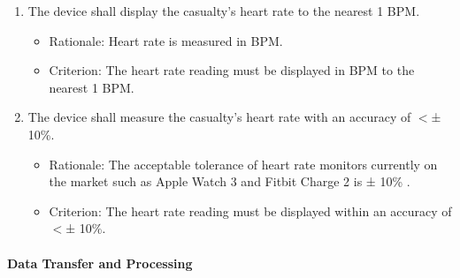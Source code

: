 \documentclass{article}
\begin{document}
\begin{enumerate}[label = \textbf{{FR7.}\arabic*} ]
	    \item The device shall display the casualty's heart rate to the nearest 1 BPM.
	        \begin{itemize}
	            \item Rationale: Heart rate is measured in BPM.
	            \item Criterion: The heart rate reading must be displayed in BPM to the nearest 1 BPM.
	        \end{itemize}
	        
	   \item The device shall measure the casualty's heart rate with an accuracy of $<$± 10\%.
	        \begin{itemize}
	            \item Rationale:  The acceptable tolerance of heart rate monitors currently on the market such as Apple Watch 3 and Fitbit Charge 2 is ± 10\% \citep{heartrate}. 
	            \item Criterion: The heart rate reading must be displayed within an accuracy of  $<$± 10\%.
	        \end{itemize}
	        
        \end{enumerate}
        \paragraph{Data Transfer and Processing}
        
\end{document}
